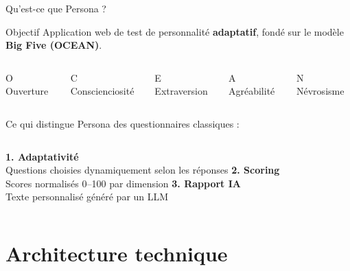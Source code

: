 \documentclass[aspectratio=169]{beamer}
\begin{document}
\begin{frame}{Qu'est-ce que Persona ?}

  \begin{block}{Objectif}
    Application web de test de personnalité \textbf{adaptatif}, fondé sur le modèle \textbf{Big Five (OCEAN)}.
  \end{block}

  \vspace{1em}

  \begin{columns}[T]
    \begin{block}{\centering O}
      \centering\small Ouverture
    \end{block}
    \begin{block}{\centering C}
      \centering\small Conscienciosité
    \end{block}
    \begin{block}{\centering E}
      \centering\small Extraversion
    \end{block}
    \begin{block}{\centering A}
      \centering\small Agréabilité
    \end{block}
    \begin{block}{\centering N}
      \centering\small Névrosisme
    \end{block}
  \end{columns}

  \vspace{1em}

  Ce qui distingue Persona des questionnaires classiques :

  \medskip
  \begin{columns}[T]
    \textbf{1. Adaptativité}\\
    \small Questions choisies dynamiquement selon les réponses
    \textbf{2. Scoring}\\
    \small Scores normalisés 0--100 par dimension
    \textbf{3. Rapport IA}\\
    \small Texte personnalisé généré par un LLM
  \end{columns}

\end{frame}


\section{Architecture technique}
\end{document}
